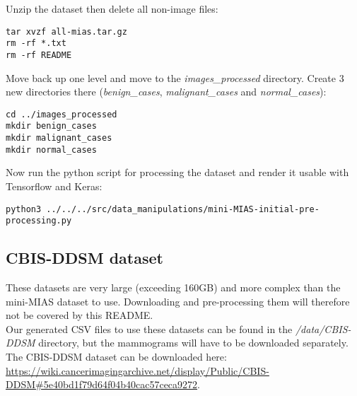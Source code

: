 Unzip the dataset then delete all non-image files:

\begin{lstlisting}
tar xvzf all-mias.tar.gz
rm -rf *.txt 
rm -rf README 
\end{lstlisting}

Move back up one level and move to the \textit{images\_processed} directory. Create 3 new directories there (\textit{benign\_cases}, \textit{malignant\_cases} and \textit{normal\_cases}):

\begin{lstlisting}
cd ../images_processed
mkdir benign_cases
mkdir malignant_cases
mkdir normal_cases
\end{lstlisting}

Now run the python script for processing the dataset and render it usable with Tensorflow and Keras:

\begin{lstlisting}
python3 ../../../src/data_manipulations/mini-MIAS-initial-pre-processing.py
\end{lstlisting}

\subsection{CBIS-DDSM dataset}

These datasets are very large (exceeding 160GB) and more complex than the mini-MIAS dataset to use. Downloading and pre-processing them will therefore not be covered by this README.\\

Our generated CSV files to use these datasets can be found in the \textit{/data/CBIS-DDSM} directory, but the mammograms will have to be downloaded separately. The CBIS-DDSM dataset can be downloaded here:  \url{https://wiki.cancerimagingarchive.net/display/Public/CBIS-DDSM#5e40bd1f79d64f04b40cac57ceca9272}.
